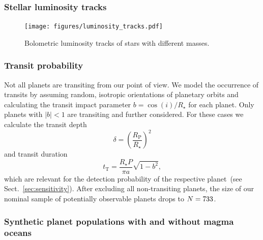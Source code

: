 \documentclass[modern]{aastex631}
\begin{document}
\subsubsection{Stellar luminosity tracks}

\begin{figure}[ht!]
    \begin{centering}
        \texttt{[image: figures/luminosity\_tracks.pdf]}
        \caption{
            Bolometric luminosity tracks of stars with different masses.
        }
        \label{fig:luminosity_tracks}
    \end{centering}
\end{figure}



\subsubsection{Transit probability}
\begin{note}
    Not all planets are transiting from our point of view.
    We model the occurrence of transits by assuming random, isotropic orientations of planetary orbits and calculating the transit impact parameter $b = \cos(i)/R_\star$ for each planet.
    Only planets with $|b| < 1$ are transiting and further considered.
    For these cases we calculate the transit depth
    \begin{equation}\label{eq:transitdepth}
        \delta = \left( \frac{R_\mathrm{P}}{R_\star} \right)^2
    \end{equation}
    and transit duration
    \begin{equation}\label{eq:transitduration}
        t_{\mathrm{T}} = \frac{R_\star P}{\pi a} \sqrt{1 - b^2},
    \end{equation}
    which are relevant for the detection probability of the respective planet~(see Sect.~\ref{sec:sensitivity}).
    After excluding all non-transiting planets, the size of our nominal sample of potentially observable planets drops to $N = 733$.
\end{note}




\subsubsection{Synthetic planet populations with and without magma oceans}
\begin{note}

\end{note}
\end{document}
